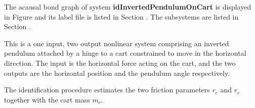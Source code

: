 

   The acausal bond graph of system \textbf{idInvertedPendulumOnCart} is
   displayed in Figure  and its label
   file is listed in Section .
   The subsystems are listed in Section .

This is a one input, two output nonlinear system comprising an
inverted pendulum attached by a hinge to a cart constrained to move in
the horizontal direction. The input is the horizontal force acting on
the cart, and the two outputs are the horizontal position and the
pendulum angle respectively.

The identification procedure estimates the two friction parameters
$r_c$ and $r_c$ together with the cart mass $m_c$.
